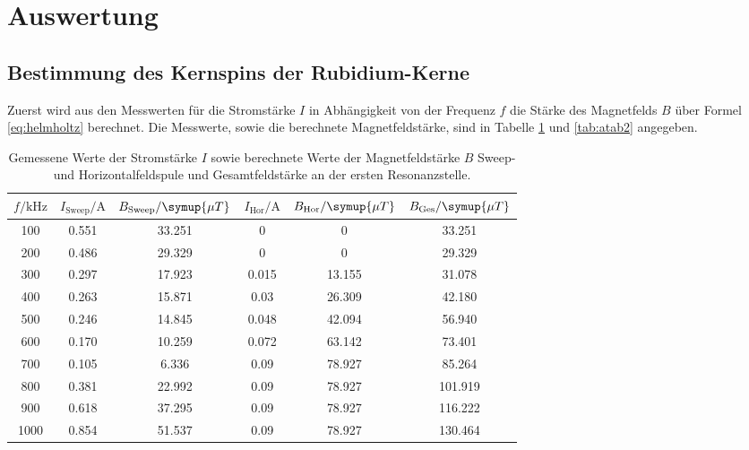 \section{Auswertung}
\subsection{Bestimmung des Kernspins der Rubidium-Kerne}
Zuerst wird aus den Messwerten für die Stromstärke $I$ in Abhängigkeit von der Frequenz $f$ die Stärke des Magnetfelds 
$B$ über Formel \eqref{eq:helmholtz}
berechnet. Die Messwerte, sowie die berechnete Magnetfeldstärke, sind in Tabelle \ref{tab:atab1} und \ref{tab:atab2} angegeben.
\FloatBarrier
\begin{table}[h]
    \centering
    \caption{Gemessene Werte der Stromstärke $I$ sowie berechnete Werte der Magnetfeldstärke $B$ Sweep- und Horizontalfeldspule und Gesamtfeldstärke an der ersten Resonanzstelle.}
    \label{tab:atab1}
    \begin{tabular}{c c c c c c}
        \toprule
        {$f / \text{kHz}$} & {$I_{\text{Sweep}} / \text{A}$} & {$B_{\text{Sweep}} / \symup{\mu T}$} & {$I_{\text{Hor}} / \text{A}$} & {$B_{\text{Hor}} / \symup{\mu T}$} & {$B_{\text{Ges}} / \symup{\mu T}$} \\
        \midrule
        100  & 0.551 & 33.251 & 0     & 0      & 33.251 \\
        200  & 0.486 & 29.329 & 0     & 0      & 29.329 \\
        300  & 0.297 & 17.923 & 0.015 & 13.155 & 31.078 \\
        400  & 0.263 & 15.871 & 0.03  & 26.309 & 42.180 \\
        500  & 0.246 & 14.845 & 0.048 & 42.094 & 56.940 \\
        600  & 0.170 & 10.259 & 0.072 & 63.142 & 73.401 \\
        700  & 0.105 &  6.336 & 0.09  & 78.927 & 85.264 \\
        800  & 0.381 & 22.992 & 0.09  & 78.927 & 101.919 \\
        900  & 0.618 & 37.295 & 0.09  & 78.927 & 116.222 \\
        1000 & 0.854 & 51.537 & 0.09  & 78.927 & 130.464 \\
        \bottomrule
    \end{tabular}
\end{table}
\FloatBarrier
\noindent
\FloatBarrier
